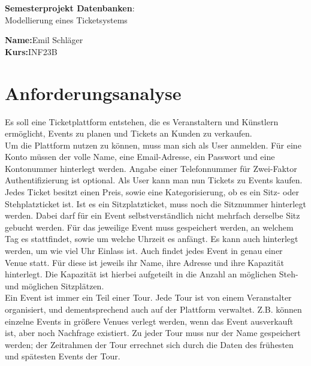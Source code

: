 \documentclass[12pt, oneside, a4paper]{article}
\newcommand{\projektname}{Modellierung eines Ticketsystems}
\newcommand{\autor}{Emil Schläger}
\newcommand{\matrikelnummer}{2988631}
\begin{document}
	\begin{center}
		\large
		\vspace{3cm}
		\textbf{Semesterprojekt Datenbanken}:\\
		\projektname{}
	\end{center}
	\vfill
	\textbf{Name:}\hfill \autor{}\\
	\textbf{Kurs:}\hfill INF23B
	
	
	
	\newpage
	\section{Anforderungsanalyse}
Es soll eine Ticketplattform entstehen, die es Veranstaltern und Künstlern ermöglicht, Events zu planen und Tickets an Kunden zu verkaufen.\\
Um die Plattform nutzen zu können, muss man sich als User anmelden. Für eine Konto müssen der volle Name, eine Email-Adresse, ein Passwort und eine Kontonummer hinterlegt werden. Angabe einer Telefonnummer für Zwei-Faktor Authentifizierung ist optional. Als User kann man nun Tickets zu Events kaufen. Jedes Ticket besitzt einen Preis, sowie eine Kategorisierung, ob es ein Sitz- oder Stehplatzticket ist. Ist es ein Sitzplatzticket, muss noch die Sitznummer hinterlegt werden. Dabei darf für ein Event selbstverständlich nicht mehrfach derselbe Sitz gebucht werden. Für das jeweilige Event muss gespeichert werden, an welchem Tag es stattfindet, sowie um welche Uhrzeit es anfängt. Es kann auch hinterlegt werden, um wie viel Uhr Einlass ist. Auch findet jedes Event in genau einer Venue statt. Für diese ist jeweils ihr Name, ihre Adresse und ihre Kapazität hinterlegt. Die Kapazität ist hierbei aufgeteilt in die Anzahl an möglichen Steh- und möglichen Sitzplätzen.\\ 
Ein Event ist immer ein Teil einer Tour. Jede Tour ist von einem Veranstalter organisiert, und dementsprechend auch auf der Plattform verwaltet. Z.B. können einzelne Events in größere Venues verlegt werden, wenn das Event ausverkauft ist, aber noch Nachfrage existiert. Zu jeder Tour muss nur der Name gespeichert werden; der Zeitrahmen der Tour errechnet sich durch die Daten des frühesten und spätesten Events der Tour.\\
\end{document}
